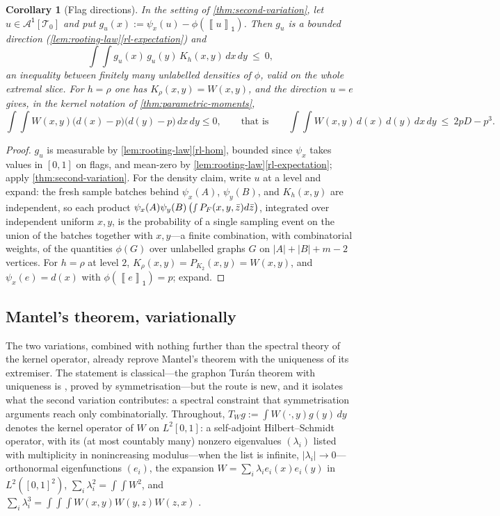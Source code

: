 \documentclass[11pt]{article}
\newtheorem{corollary}[corollary]{Corollary}
\theoremstyle{definition}
\newcommand{\A}{\mathcal{A}}
\newcommand{\T}{\mathcal{T}}
\newcommand{\avg}[2]{\left\llbracket #1 \right\rrbracket_{#2}}
\newcommand{\vtype}{\mathsf{1}}
\begin{document}
\begin{corollary}[Flag directions]\label{cor:second-variation-flags}
In the setting of \cref{thm:second-variation}, let $u\in\A^{\vtype}[\T_0]$ and put
$g_u(x):=\psi_x(u)-\phi(\avg{u}{\vtype})$.  Then $g_u$ is a bounded direction
(\cref{lem:rooting-law}\ref{rl-expectation}) and
\[
  \int\!\!\int g_u(x)\,g_u(y)\,K_h(x,y)\,dx\,dy\ \le\ 0 ,
\]
an inequality between finitely many unlabelled densities of $\phi$, valid on the whole
extremal slice.  For $h=\rho$ one has $K_\rho(x,y)=W(x,y)$, and the direction $u=e$
gives, in the kernel notation of \cref{thm:parametric-moments},
\[
  \int\!\!\int W(x,y)\bigl(d(x)-p\bigr)\bigl(d(y)-p\bigr)\,dx\,dy\le0,
  \qquad\text{that is}\qquad
  \int\!\!\int W(x,y)\,d(x)\,d(y)\,dx\,dy\ \le\ 2pD-p^3 .
\]
\end{corollary}

\begin{proof}
$g_u$ is measurable by \cref{lem:rooting-law}\ref{rl-hom}, bounded since $\psi_x$
takes values in $[0,1]$ on flags, and mean-zero by
\cref{lem:rooting-law}\ref{rl-expectation}; apply \cref{thm:second-variation}.  For
the density claim, write $u$ at a level and expand: the fresh sample batches behind
$\psi_x(A)$, $\psi_y(B)$, and $K_h(x,y)$ are independent, so each product
$\psi_x(A)\psi_y(B)\,\bigl(\smallint P_F(x,y,\bar z)d\bar z\bigr)$, integrated over
independent uniform $x,y$, is the probability of a single sampling event on the union
of the batches together with $x,y$---a finite combination, with combinatorial
weights, of the quantities $\phi(G)$ over unlabelled graphs $G$ on
$|A|+|B|+m-2$ vertices.  For $h=\rho$ at level $2$,
$K_\rho(x,y)=P_{K_2}(x,y)=W(x,y)$, and $\psi_x(e)=d(x)$ with
$\phi(\avg{e}{\vtype})=p$; expand.
\end{proof}

\subsection{Mantel's theorem, variationally}

The two variations, combined with nothing further than the spectral theory of the
kernel operator, already reprove Mantel's theorem with the uniqueness of its
extremiser.  The statement is classical---the graphon Tur\'an theorem with uniqueness
is \cite[Theorem 16.23]{Lovasz2012book}, proved by symmetrisation---but the route is
new, and it isolates what the second variation contributes: a spectral constraint that
symmetrisation arguments reach only combinatorially.  Throughout,
$T_Wg:=\int W(\cdot,y)g(y)\,dy$ denotes the kernel operator of
$W$ on $L^2[0,1]$: a self-adjoint Hilbert--Schmidt operator, with its (at most
countably many) nonzero eigenvalues $(\lambda_i)$ listed with multiplicity in
nonincreasing modulus---when the list is infinite, $|\lambda_i|\to0$---orthonormal
eigenfunctions $(e_i)$,
the expansion $W=\sum_i\lambda_ie_i(x)e_i(y)$ in $L^2([0,1]^2)$,
$\sum_i\lambda_i^2=\int\!\!\int W^2$, and
$\sum_i\lambda_i^3=\int\!\!\int\!\!\int W(x,y)W(y,z)W(z,x)$
\cite{Lovasz2012book}.
\end{document}
